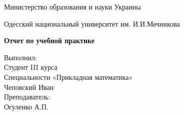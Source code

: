 \documentclass[12pt,a4paper]{scrartcl}
\begin{document}
\thispagestyle{empty}
\begin{center}
Министерство образования и науки Украины
\end{center}
\begin{center}
Одесский национальный университет им. И.И.Мечникова
\end{center}
\par\bigskip
\par\bigskip
\par\bigskip
\par\bigskip
\par\bigskip
\par\bigskip
\par\bigskip
\par\bigskip
\par\bigskip
\par\bigskip
\par\bigskip
\par\bigskip
\par\bigskip
\par\bigskip
\par\bigskip
\begin{center}
\Large\textbf{Отчет по учебной практике}
\end{center}
\par\bigskip
\par\bigskip
\par\bigskip
\par\bigskip
\par\bigskip
\par\bigskip
\par\bigskip
\par\bigskip
\begin{flushright}
Выполнил:\\
Студент III курса\\
Специальности «Прикладная математика»\\
Чеповский Иван\\
Преподаватель:\\
Огуленко А.П.
\end{flushright}
\par\bigskip
\par\bigskip
\par\bigskip
\par\bigskip
\par\bigskip
\par\bigskip
\par\bigskip
\par\bigskip
\par\bigskip
\end{document}

